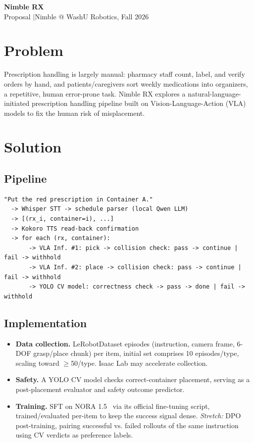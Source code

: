 \documentclass[11.5pt,a4paper]{article}
\begin{document}
\begin{center}
  {\huge \textbf{Nimble RX}}\\[6pt]
  {\normalsize Proposal \quad$\vert$\quad Nimble @ WashU Robotics, Fall 2026}
\end{center}
\vspace{4pt}

\section*{Problem}
Prescription handling is largely manual: pharmacy staff count, label, and verify orders by hand, and patients/caregivers sort weekly medications into organizers, a repetitive, human error-prone task. Nimble RX explores a natural-language-initiated prescription handling pipeline built on Vision-Language-Action (VLA) models to fix the human risk of misplacement.

\section*{Solution}
\subsection*{Pipeline}
\begingroup
\footnotesize
\begin{verbatim}
"Put the red prescription in Container A." 
  -> Whisper STT -> schedule parser (local Qwen LLM)
  -> [(rx_i, container=i), ...]
  -> Kokoro TTS read-back confirmation 
  -> for each (rx, container):
       -> VLA Inf. #1: pick -> collision check: pass -> continue | fail -> withhold
       -> VLA Inf. #2: place -> collision check: pass -> continue | fail -> withhold
       -> YOLO CV model: correctness check -> pass -> done | fail -> withhold
\end{verbatim}
\endgroup

\subsection*{Implementation}
\begin{itemize}
\item \textbf{Data collection.} LeRobotDataset episodes (instruction, camera frame, 6-DOF grasp/place chunk) per item, initial set comprises 10 episodes/type, scaling toward $\geq$50/type. Isaac Lab may accelerate collection.
\item \textbf{Safety.} A YOLO CV model checks correct-container placement, serving as a post-placement evaluator and safety outcome predictor.
\item \textbf{Training.} SFT on NORA 1.5~\cite{nora} via its official fine-tuning script, trained/evaluated per-item to keep the success signal dense. \textit{Stretch:} DPO post-training, pairing successful vs. failed rollouts of the same instruction using CV verdicts as preference labels.
\end{itemize}
\end{document}
